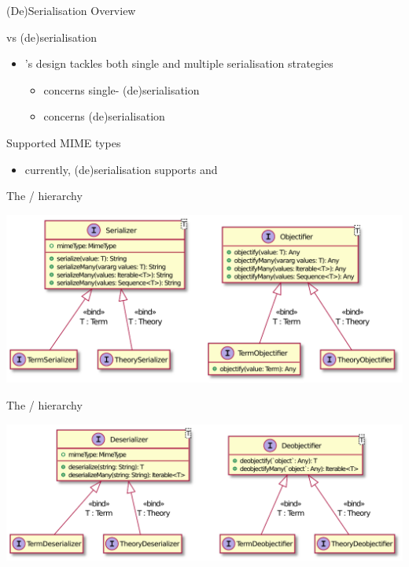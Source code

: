 \documentclass[handout]{beamer}
\begin{document}
\begin{frame}[allowframebreaks]{(De)Serialisation Overview}
    \framebreak

    \begin{block}{ vs  (de)serialisation}
        \begin{itemize}
            \item \twopkt's design tackles both single and multiple serialisation strategies
            \begin{itemize}
                \item {} concerns single- (de)serialisation
                \item {} concerns  (de)serialisation
            \end{itemize}
        \end{itemize}
    \end{block}
    \begin{block}{Supported MIME types}
        \begin{itemize}
            \item currently, (de)serialisation supports  and 
        \end{itemize}
    \end{block}

\end{frame}

\begin{frame}[allowframebreaks]{The / hierarchy}
    \begin{center}
        \includegraphics[width=\linewidth]{img/serialization.pdf}
    \end{center}
\end{frame}

\begin{frame}[allowframebreaks]{The / hierarchy}
    \begin{center}
        \includegraphics[width=\linewidth]{img/deserialization.pdf}
    \end{center}
\end{frame}
\end{document}
